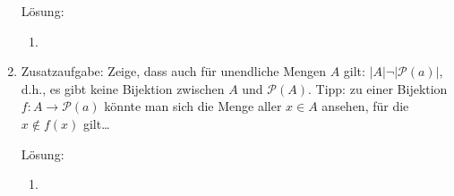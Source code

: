 \documentclass[../main.tex]{subfiles}
\begin{document}
\begin{enumerate}
	      Lösung:
	      \begin{enumerate}
		      \item
	      \end{enumerate}
	\item  Zusatzaufgabe: Zeige, dass auch für unendliche Mengen \( A \) gilt: \( |A| \neg |\mathcal{P}(a)| \),
	      d.h., es gibt keine Bijektion zwischen \( A \) und \( \mathcal{P}(A) \).
	      Tipp: zu einer Bijektion \( f: A \rightarrow \mathcal{P}(a) \) könnte man sich die Menge aller
	      \( x \in A \) ansehen, für die \( x \notin f(x) \) gilt\dots

	      Lösung:
	      \begin{enumerate}
		      \item
	      \end{enumerate}
\end{enumerate}
\end{document}
